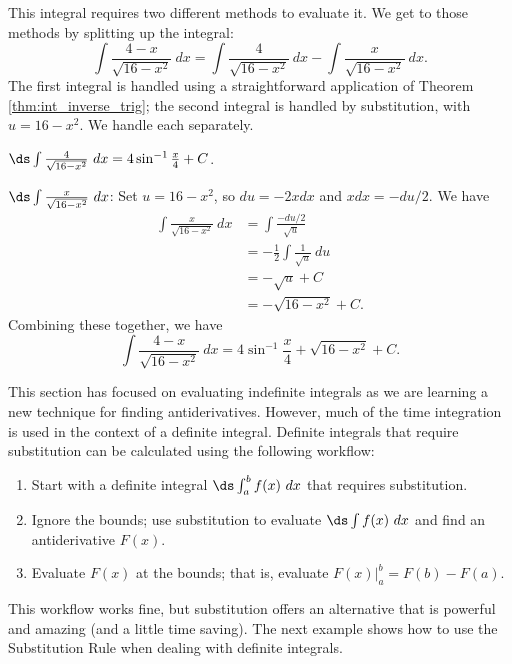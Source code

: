 \begin{solution}
{This integral requires two different methods to evaluate it. We get to those methods by splitting up the integral: 
$$ \int \frac{4-x}{\sqrt{16-x^2}}\ dx = \int \frac{4}{\sqrt{16-x^2}}\ dx - \int \frac{x}{\sqrt{16-x^2}}\ dx.$$
The first integral is handled using a straightforward application of Theorem \ref{thm:int_inverse_trig}; the second integral is handled by substitution, with $u = 16-x^2$. We handle each separately.

$\ds \int \frac{4}{\sqrt{16-x^2}}\ dx = 4\sin^{-1}\frac{x}{4} + C$.
\vskip 10pt

$\ds \int\frac{x}{\sqrt{16-x^2}}\ dx$: Set $u = 16-x^2$, so $du = -2xdx$ and $xdx = -du/2$. We have 
\begin{align*}
\int\frac{x}{\sqrt{16-x^2}}\ dx &= \int\frac{-du/2}{\sqrt{u}}\\
				&= -\frac12\int \frac{1}{\sqrt{u}}\ du \\
				&= - \sqrt{u} + C\\
				&= -\sqrt{16-x^2} + C.
\end{align*}
Combining these together, we have 
$$ \int \frac{4-x}{\sqrt{16-x^2}}\ dx = 4\sin^{-1}\frac x4 + \sqrt{16-x^2}+C.$$
}
\end{solution}







This section has focused on evaluating indefinite integrals as we are learning a new technique for finding antiderivatives. However, much of the time integration is used in the context of a definite integral. Definite integrals that require substitution can be calculated using the following workflow:

\begin{enumerate}
\item		Start with a definite integral $\ds \int_a^b f(x)\ dx$ that requires substitution.
\item		Ignore the bounds; use substitution to evaluate $\ds \int f(x)\ dx$ and find an antiderivative $F(x)$.
\item		Evaluate $F(x)$ at the bounds; that is, evaluate $F(x)\Big|_a^b = F(b) - F(a)$.
\end{enumerate}
This workflow works fine, but substitution offers an alternative that is powerful and amazing (and a little time saving).  The next example shows how to use the Substitution Rule when dealing with definite integrals.

